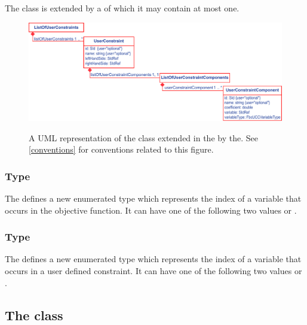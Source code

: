 The \SBML \Model class is extended by a  of which it may contain at most one.
%
\begin{figure}[ht]
  \centering
  \includegraphics[width=\textwidth]{images/fbc_v3_uml_userconstraint.pdf}\\
  \caption{A UML representation of the \SBML \Model class extended in
  the \FBCPackage by the\ListOfUserConstraints. See \ref{conventions} for conventions related to this
  figure.}
  \label{fig:fbc_v3_uml_user_constraints}
\end{figure}


\subsubsection{Type }
\label{primtype-fbcfluxobjectivevariabletype}

The \FBCPackage defines a new enumerated type  which
represents the index of a variable that occurs in the objective function. It can have one
of the following two values  or .

\subsubsection{Type }
\label{primtype-fbcuserconstraintvariabletype}

The \FBCPackage defines a new enumerated type  which
represents the index of a variable that occurs in a user defined constraint. It can have one
of the following two values  or .

\subsection{The \FBC {} class}

